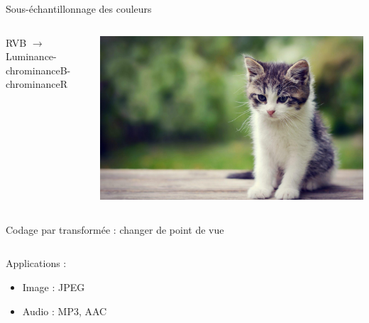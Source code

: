 \documentclass[9pt, aspectratio=169]{beamer}
\begin{document}
\begin{frame}[allowframebreaks]{Sous-échantillonnage des couleurs} %
\begin{columns}
   \begin{column}{0.6\textwidth}
    RVB $\rightarrow$ Luminance-chrominanceB-chrominanceR
   \end{column}
   \begin{column}{0.39\textwidth}
		\includegraphics[width=\textwidth]{fig/cat/cat.jpg}
        
   \end{column}
\end{columns}
\framebreak
{}
\end{frame}

\begin{frame}{Codage par transformée : changer de point de vue} %
\begin{columns}
   \begin{column}{0.6\textwidth}
		Applications :
        \begin{itemize}
            \item Image : JPEG
            \item Audio : MP3, AAC
        \end{itemize}

   \end{column}
   \begin{column}{0.39\textwidth}
		
   \end{column}
\end{columns}
\end{frame}
\end{document}

